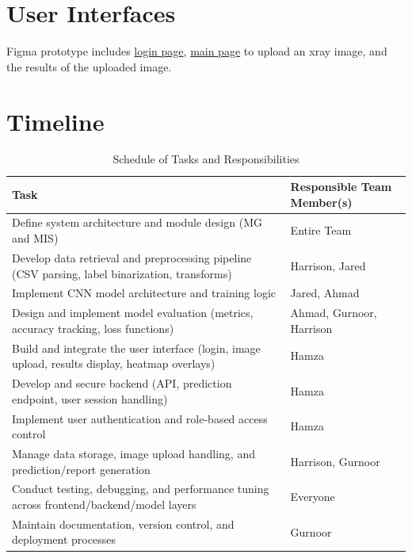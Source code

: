 \documentclass[12pt, titlepage]{article}
\begin{document}
\section{User Interfaces}

Figma prototype includes \href{https://www.figma.com/proto/O3J164KiWA8uFswM7JgFy4/Capstone-Design?node-id=0-1&t=JT3KrFZiVb66Ch-1}{login page}, \href{https://www.figma.com/proto/O3J164KiWA8uFswM7JgFy4/Capstone-Design?node-id=0-1&t=JT3KrFZiVb66Ch-1}{main page} to upload an xray image, and the results of the uploaded image.

\section{Timeline}

\begin{table}[h!]
\centering
\begin{tabular}{|p{10cm}|l|}
\hline
\textbf{Task} & \textbf{Responsible Team Member(s)} \\
\hline
Define system architecture and module design (MG and MIS) & Entire Team \\
\hline
Develop data retrieval and preprocessing pipeline (CSV parsing, label binarization, transforms) & Harrison, Jared \\
\hline
Implement CNN model architecture and training logic & Jared, Ahmad \\
\hline
Design and implement model evaluation (metrics, accuracy tracking, loss functions) & Ahmad, Gurnoor, Harrison \\
\hline
Build and integrate the user interface (login, image upload, results display, heatmap overlays) & Hamza \\
\hline
Develop and secure backend (API, prediction endpoint, user session handling) & Hamza \\
\hline
Implement user authentication and role-based access control & Hamza \\
\hline
Manage data storage, image upload handling, and prediction/report generation & Harrison, Gurnoor \\
\hline
Conduct testing, debugging, and performance tuning across frontend/backend/model layers & Everyone \\
\hline
Maintain documentation, version control, and deployment processes & Gurnoor \\
\hline
\end{tabular}
\caption{Schedule of Tasks and Responsibilities}
\label{tab:tasks}
\end{table}
\end{document}
